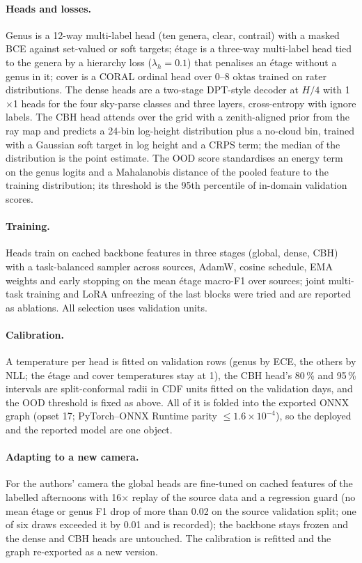 \paragraph{Heads and losses.} Genus is a 12-way multi-label head (ten genera, clear, contrail) with a masked BCE
against set-valued or soft targets; \'etage is a three-way multi-label head tied to the genera by a hierarchy loss
($\lambda_h=0.1$) that penalises an \'etage without a genus in it; cover is a CORAL ordinal head over 0--8 oktas
trained on rater distributions. The dense heads are a two-stage DPT-style decoder at $H/4$ with 1$\times$1 heads for
the four sky-parse classes and three layers, cross-entropy with ignore labels. The CBH head attends over the grid
with a zenith-aligned prior from the ray map and predicts a 24-bin log-height distribution plus a no-cloud bin,
trained with a Gaussian soft target in log height and a CRPS term; the median of the distribution is the point
estimate. The OOD score standardises an energy term on the genus logits and a Mahalanobis distance of the pooled
feature to the training distribution; its threshold is the 95th percentile of in-domain validation scores.

\paragraph{Training.} Heads train on cached backbone features in three stages (global, dense, CBH) with a
task-balanced sampler across sources, AdamW, cosine schedule, EMA weights and early stopping on the mean \'etage
macro-F1 over sources; joint multi-task training and LoRA unfreezing of the last blocks were tried and are reported
as ablations. All selection uses validation units.

\paragraph{Calibration.} A temperature per head is fitted on validation rows (genus by ECE, the others by NLL; the
\'etage and cover temperatures stay at 1), the CBH head's 80\,\% and 95\,\% intervals are split-conformal radii in
CDF units fitted on the validation days, and the OOD threshold is fixed as above. All of it is folded into the
exported ONNX graph (opset 17; PyTorch--ONNX Runtime parity $\le 1.6\times10^{-4}$), so the deployed and the reported
model are one object.

\paragraph{Adapting to a new camera.} For the authors' camera the global heads are fine-tuned on cached features
of the labelled afternoons with 16$\times$ replay of the source data and a regression guard (no mean \'etage or genus
F1 drop of more than 0.02 on the source validation split; one of six draws exceeded it by 0.01 and is recorded);
the backbone stays frozen and the dense and CBH heads are untouched. The calibration is refitted and the graph
re-exported as a new version.
